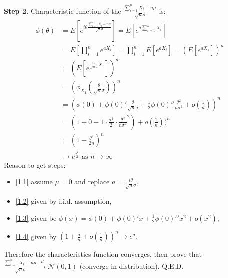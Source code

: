\documentclass[11pt]{article}
\theoremstyle{definition}
\theoremstyle{remark}
\begin{document}
    \textbf{Step 2.} Characteristic function of the $\frac{\sum_{i=1}^{n} X_i -n\mu}{\sqrt{n}\sigma}$ is: 
    \begin{align}
        \phi(\theta) &= E[e^{i\theta \frac{\sum_{i=1}^{n} X_i -n\mu}{\sqrt{n}\sigma}}] = E[e^{a\sum_{i=1}^{n} X_i}] \label{1.1}\\
        &= E[\prod_{i=1}^n e^{aX_i}] = \prod_{i=1}^n E[ e^{aX_i}]  = (E[e^{a X_1}])^n\label{1.2}\\
        &=(E[e^{\frac{i\theta}{\sqrt{n}\sigma} X_1}])^n \\
        &= (\phi_{X_1}(\frac{\theta}{\sqrt{n}\sigma}))^n \\
        &= (\phi(0) + \phi(0)' \frac{\theta}{\sqrt{n}\sigma} + \frac{1}{2} \phi(0)'' \frac{\theta^2}{n\sigma^2} + o(\frac{1}{n}))^n \label{1.3} \\
        &= (1 + 0 - 1\cdot \frac{\sigma^2}{2}\cdot\frac{\theta^2}{n\sigma^2}^2) + o(\frac{1}{n}))^n \\
        &=(1 - \frac{\theta^2}{2n})^n  \label{1.4}\\
        & \rightarrow e^{\frac{\theta^2}{2}} \text{ as } n \rightarrow \infty
    \end{align}
    Reason to get steps:
    \begin{itemize}
        \item \eqref{1.1} assume $\mu = 0$ and replace $a = \frac{i\theta}{\sqrt{n}\sigma}$,
        \item \eqref{1.2} given by i.i.d. assumption,
        \item \eqref{1.3} given be $\phi(x) = \phi(0) + \phi(0)' x + \frac{1}{2} \phi(0)\prime \prime x^2 + o(x^2)$,
        \item \eqref{1.4} given by $(1 + \frac{a}{n}+o(\frac{1}{n}))^n \rightarrow e^a$.
    \end{itemize}
    Therefore the characteristics function converges, then prove that $\frac{\sum_{i=1}^{n} X_i -n\mu}{\sqrt{n}\sigma}\xrightarrow{d} \mathcal{N}(0,1)$ (converge in distribution). Q.E.D.
\end{document}
